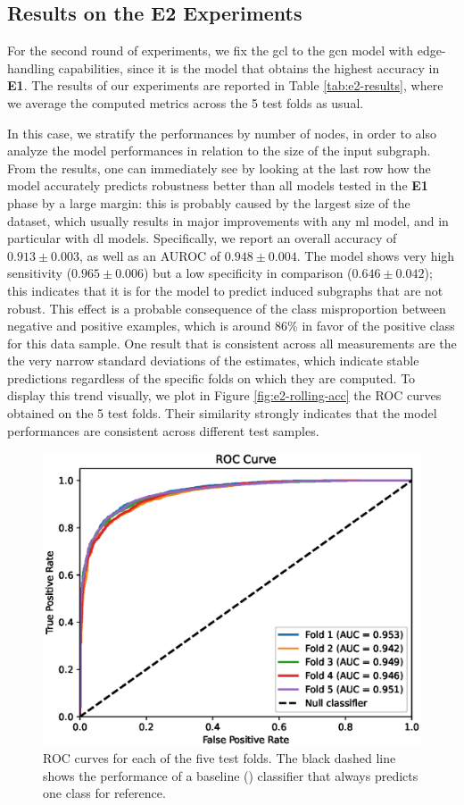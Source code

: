 \subsection{Results on the E2 Experiments}\label{sec:e2-results}
For the second round of experiments, we fix the \gls{gcl} to the \gls{gcn} model with edge-handling capabilities, since it is the model that obtains the highest accuracy in \textbf{E1}.
The results of our experiments are reported in Table \ref{tab:e2-results}, where we average the computed metrics across the 5 test folds as usual.

In this case, we stratify the performances by number of nodes, in order to also analyze the model performances in relation to the size of the input subgraph. From the results, one can immediately see by looking at the last row how the model accurately predicts robustness better than all models tested in the \textbf{E1} phase by a large margin: this is probably caused by the largest size of the dataset, which usually results in major improvements with any \gls{ml} model, and in particular with \gls{dl} models. Specifically, we report an overall accuracy of $0.913 \pm 0.003$, as well as an AUROC of $0.948 \pm 0.004$. The model shows very high sensitivity ($0.965 \pm 0.006$) but a low specificity in comparison ($0.646 \pm 0.042$); this indicates that it is  for the model to predict induced subgraphs that are not robust. This effect is a probable consequence of the class misproportion between negative and positive examples, which is around 86\% in favor of the positive class for this data sample. One result that is consistent across all measurements are the the very narrow standard deviations of the estimates, which indicate stable predictions regardless of the specific folds on which they are computed. To display this trend visually, we plot in Figure \ref{fig:e2-rolling-acc} the ROC curves obtained on the 5 test folds. Their similarity strongly indicates that the model performances are consistent across different test samples.
\begin{figure}
    \centering
    \includegraphics[width=.65\textwidth]{Figures/Chapter5/e2-roc-curve.eps}
    \caption{ROC curves for each of the five test folds. The black dashed line shows the performance of a baseline () classifier that always predicts one class for reference.}\label{fig:e2-roc-curve}
\end{figure}
